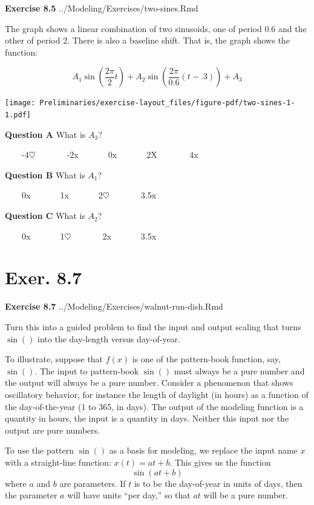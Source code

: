\documentclass[
  letterpaper,
  DIV=11,
  numbers=noendperiod,
  oneside]{article}
\begin{document}
\begin{multicols}{2}
\textbf{Exercise 8.5} ../Modeling/Exercises/two-sines.Rmd

The graph shows a linear combination of two sinusoids, one of period 0.6
and the other of period 2. There is also a baseline shift. That is, the
graph shows the function:

\[A_1 \sin\left(\frac{2\pi}{2}t\right) + A_2 \sin\left(\frac{2\pi}{0.6} (t-.3)\right) + A_3\]

\texttt{[image: Preliminaries/exercise-layout\_files/figure-pdf/two-sines-1-1.pdf]}

\textbf{Question A} What is \(A_3\)?

~~~~{-4{\(\heartsuit\ \)}}~~~~~~~{-2{x}}~~~~~~~{0{x}}~~~~~~~{2{︎X
}}~~~~~~~{4{x}}

\textbf{Question B} What is \(A_1\)?

~~~~{0{x}}~~~~~~~{1{x}}~~~~~~~{2{\(\heartsuit\ \)}}~~~~~~~{3.5{x}}

\textbf{Question C} What is \(A_2\)?

~~~~{0{x}}~~~~~~~{1{\(\heartsuit\ \)}}~~~~~~~{2{x}}~~~~~~~{3.5{x}}

\hypertarget{exer.-8.7}{%
\section*{Exer. 8.7}\label{exer.-8.7}}

\textbf{Exercise 8.7} ../Modeling/Exercises/walnut-run-dish.Rmd

Turn this into a guided problem to find the input and output scaling
that turns \(\sin()\) into the day-length versus day-of-year.

To illustrate, suppose that \(f(x)\) is one of the pattern-book
function, say, \(\sin()\). The input to pattern-book \(\sin()\) must
always be a pure number and the output will always be a pure number.
Consider a phenomenon that shows oscillatory behavior, for instance the
length of daylight (in hours) as a function of the day-of-the-year (1 to
365, in days). The output of the modeling function is a quantity in
hours, the input is a quantity in days. Neither this input nor the
output are pure numbers.

To use the pattern \(\sin()\) as a basis for modeling, we replace the
input name \(x\) with a straight-line function: \(x(t) = a t + b\). This
gives us the function \[\sin(a t + b)\] where \(a\) and \(b\) are
parameters. If \(t\) is to be the day-of-year in units of days, then the
parameter \(a\) will have units ``per day,'' so that \(a t\) will be a
pure number.


\end{multicols}
\end{document}
